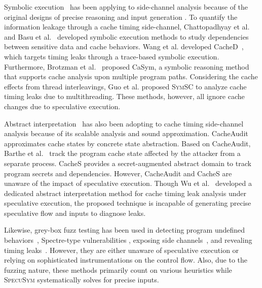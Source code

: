 \documentclass[sigconf,screen]{acmart}
\newcommand\ignore[1]{}
\newcommand{\SpecuSym}{\textsc{SpecuSym} }
\begin{document}
Symbolic execution~\cite{King76} has been applying to side-channel analysis 
because of the original designs of precise reasoning and input generation
\cite{PasareanuPM16,BangAPPB16,PhanBPMB17,BrennanSB18,BangRB18}. To quantify 
the information leakage through a cache timing side-channel, Chattopadhyay
et al.~\cite{ChattopadhyayBRZ17,Chattopadhyay17} and Basu et al.~\cite{BasuC17}
developed symbolic execution methods to study dependencies between sensitive 
data and cache behaviors. Wang et al. developed CacheD~\cite{WangWLZW17}, 
which targets timing leaks through a trace-based symbolic execution. 
Furthermore, Brotzman et al.~\cite{BrotzmanLZTK2018} proposed CaSym, a 
symbolic reasoning method that supports cache analysis upon multiple program 
paths. Considering the cache effects from thread interleavings, Guo et al.
\cite{GuoWW18} proposed \textsc{SymSC} to analyze cache timing leaks due to 
multithreading. These methods, however, all ignore cache changes due to 
speculative execution.  


Abstract interpretation~\cite{CousotC77} has also been adopting to cache timing
side-channel analysis because of its scalable analysis and sound approximation. 
CacheAudit~\cite{DoychevFKMR13} approximates cache states by concrete state 
abstraction. Based on CacheAudit, Barthe et al.~\cite{BartheKMO14} track the 
program cache state affected by the attacker from a separate process. CacheS
\cite{WangBLWZW19} provides a secret-augmented abstract domain to track program 
secrets and dependencies. However, CacheAudit and CacheS are unaware of the 
impact of speculative execution. Though Wu et al.~\cite{WuW19} developed a 
dedicated abstract interpretation method for cache timing leak analysis under 
speculative execution, the proposed technique is incapable of generating precise 
speculative flow and inputs to diagnose leaks. 


\ignore{
It treats public data in a coarse-grained 
fashion and secret data in a finer-grained manner to balance the scalability 
and precision.
}


Likewise, grey-box fuzz testing has been used in detecting program 
undefined behaviors~\cite{ChenLXGZZWL19}, Spectre-type vulnerabilities
\cite{OleksenkoTSF19}, exposing side channels~\cite{NilizadehNP19}, and 
revealing timing leaks~\cite{HeEC19}. However, they are either unaware 
of speculative execution or relying on sophisticated instrumentations on 
the control flow. Also, due to the fuzzing nature, these methods primarily 
count on various heuristics while \SpecuSym systematically solves for 
precise inputs.
\end{document}
